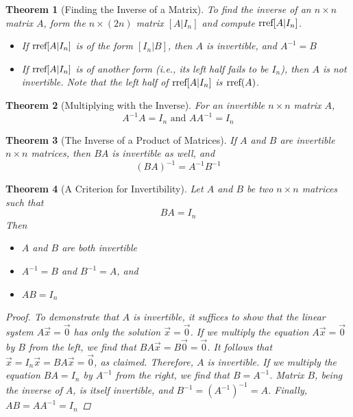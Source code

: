 \documentclass[10pt]{report}
\newtheorem{thm2}{Theorem}[section]
\newcommand{\rref}{\textup{rref}}
\begin{document}
\begin{thm2}[Finding the Inverse of a Matrix]
To find the inverse of an $n\times n$ matrix $A$, form the $n\times (2n)$ matrix $[A|I_n]$ and compute $\rref[A|I_n]$.
\begin{itemize}
\item If $\rref[A|I_n]$ is of the form $[I_n|B]$, then $A$ is invertible, and $A^{-1}=B$
\item If $\rref[A|I_n]$ is of another form (i.e., its left half fails to be $I_n$), then $A$ is not invertible. Note that the left half of $\rref[A|I_n]$ is $\rref(A)$.
\end{itemize}
\end{thm2}
\begin{thm2}[Multiplying with the Inverse]
For an invertible $n\times n$ matrix $A$, 
$$A^{-1}A = I_n \text{  and  } AA^{-1} = I_n$$
\end{thm2}
\begin{thm2}[The Inverse of a Product of Matrices]
If $A$ and $B$ are invertible $n\times n$ matrices, then $BA$ is invertible as well, and
$$(BA)^{-1} = A^{-1}B^{-1}$$
\end{thm2}
\begin{thm2}[A Criterion for Invertibility]
Let $A$ and $B$ be two $n\times n$ matrices such that
$$BA=I_n$$
Then
\begin{itemize}
\item[a.] $A$ and $B$ are both invertible
\item[b.] $A^{-1}=B$ and $B^{-1}=A$, and
\item[c.] $AB=I_n$
\end{itemize}
\begin{proof}
To demonstrate that $A$ is invertible, it suffices to show that the linear system $A\vec{x}=\vec{0}$ has only the solution $\vec{x}=\vec{0}$. If we multiply the equation $A\vec{x}=\vec{0}$ by $B$ from the left, we find that $BA\vec{x}=B\vec{0}=\vec{0}$. It follows that $\vec{x}=I_n\vec{x} =BA\vec{x}=\vec{0}$, as claimed. Therefore, $A$ is invertible. If we multiply the equation $BA=I_n$ by $A^{-1}$ from the right, we find that $B=A^{-1}$. Matrix $B$, being the inverse of $A$, is itself invertible, and $B^{-1}=(A^{-1})^{-1}=A$. Finally, $AB=AA^{-1}=I_n$
\end{proof}
\end{thm2}
\end{document}

